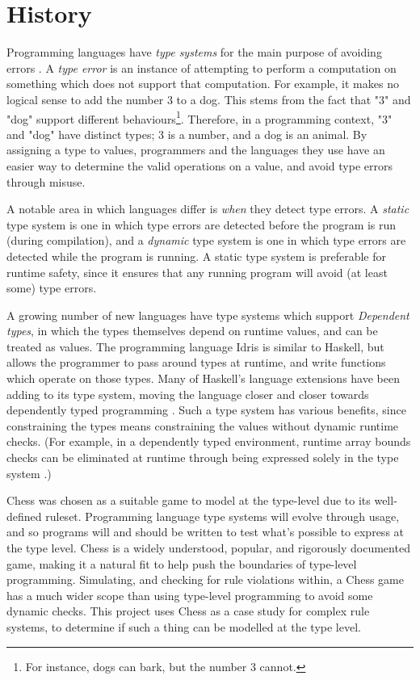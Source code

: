 \documentclass[12pt, a4paper, bibliography=totocnumbered]{scrreprt}
\begin{document}
\chapter{History}

Programming languages have \emph{type systems} for the main purpose of avoiding errors \cite{cardellitypes}. A \emph{type error} is an instance of attempting to perform a computation on something which does not support that computation. For example, it makes no logical sense to add the number 3 to a dog. This stems from the fact that "3" and "dog" support different behaviours\footnote{For instance, dogs can bark, but the number 3 cannot.}. Therefore, in a programming context, "3" and "dog" have distinct types; 3 is a number, and a dog is an animal. By assigning a type to values, programmers and the languages they use have an easier way to determine the valid operations on a value, and avoid type errors through misuse.

A notable area in which languages differ is \emph{when} they detect type errors. A \emph{static} type system is one in which type errors are detected before the program is run (during compilation), and a \emph{dynamic} type system is one in which type errors are detected while the program is running. A static type system is preferable for runtime safety, since it ensures that any running program will avoid (at least some) type errors.

A growing number of new languages have type systems which support \emph{Dependent types}, in which the types themselves depend on runtime values, and can be treated as values. The programming language Idris is similar to Haskell, but allows the programmer to pass around types at runtime, and write functions which operate on those types. Many of Haskell's language extensions have been adding to its type system, moving the language closer and closer towards dependently typed programming \cite{singletons}. Such a type system has various benefits, since constraining the types means constraining the values without dynamic runtime checks. (For example, in a dependently typed environment, runtime array bounds checks can be eliminated at runtime through being expressed solely in the type system \cite{dependentarray}.)

Chess was chosen as a suitable game to model at the type-level due to its well-defined ruleset. Programming language type systems will evolve through usage, and so programs will and should be written to test what's possible to express at the type level. Chess is a widely understood, popular, and rigorously documented game, making it a natural fit to help push the boundaries of type-level programming. Simulating, and checking for rule violations within, a Chess game has a much wider scope than using type-level programming to avoid some dynamic checks. This project uses Chess as a case study for complex rule systems, to determine if such a thing can be modelled at the type level.
\end{document}
